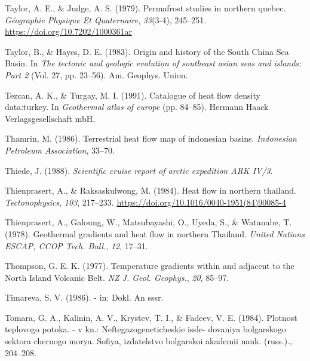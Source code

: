 \begin{CSLReferences}{1}{1}
\leavevmode{}%
Taylor, A. E., \& Judge, A. S. (1979). Permafrost studies in northern quebec. \emph{Géographie Physique Et Quaternaire}, \emph{33}(3-4), 245--251. \url{https://doi.org/10.7202/1000361ar}

\leavevmode{}%
Taylor, B., \& Hayes, D. E. (1983). Origin and history of the {South China Sea Basin}. In \emph{The tectonic and geologic evolution of southeast asian seas and islands: Part 2} (Vol. 27, pp. 23--56). Am. Geophys. Union.

\leavevmode{}%
Tezcan, A. K., \& Turgay, M. I. (1991). Catalogue of heat flow density data:turkey. In \emph{Geothermal atlas of europe} (pp. 84--85). Hermann Haack Verlagsgesellschaft mbH.

\leavevmode{}%
Thamrin, M. (1986). Terrestrial heat flow map of indonesian basins. \emph{Indonesian Petroleum Association}, 33--70.

\leavevmode{}%
Thiede, J. (1988). \emph{Scientific cruise report of arctic expedition ARK IV/3}.

\leavevmode{}%
Thienprasert, A., \& Raksaskulwong, M. (1984). Heat flow in northern thailand. \emph{Tectonophysics}, \emph{103}, 217--233. \url{https://doi.org/10.1016/0040-1951(84)90085-4}

\leavevmode{}%
Thienprasert, A., Galoung, W., Matsubayashi, O., Uyeda, S., \& Watanabe, T. (1978). Geothermal gradients and heat flow in northern {Thailand}. \emph{United Nations ESCAP, CCOP Tech. Bull.}, \emph{12}, 17--31.

\leavevmode{}%
Thompson, G. E. K. (1977). Temperature gradients within and adjacent to the {North Island Volcanic Belt}. \emph{NZ J. Geol. Geophys.}, \emph{20}, 85--97.

\leavevmode{}%
Timareva, S. V. (1986). - in: Dokl. An sssr.

\leavevmode{}%
Tomara, G. A., Kalinin, A. V., Krystev, T. I., \& Fadeev, V. E. (1984). Plotnost teplovogo potoka. - v kn.: Neftegazogeneticheskie issle- dovaniya bolgarskogo sektora chernogo morya. Sofiya, izdatelstvo bolgarskoi akademii nauk. (russ.)., 204--208.


\end{CSLReferences}
